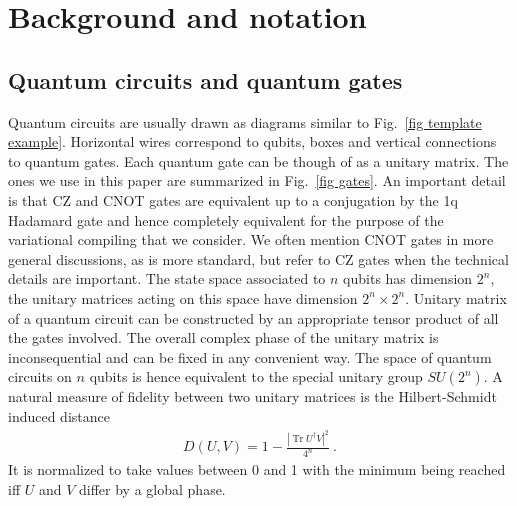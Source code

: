 \documentclass[twocolumn, amsfonts, amssymb, aps, nofootinbib]{revtex4-2}
\newcommand{\CZ}{\textsf{CZ }}
\newcommand{\CX}{\textsf{CNOT }}
\begin{document}
\section{Background and notation \label{sec gates}}
\subsection{Quantum circuits and quantum gates}
Quantum circuits are usually drawn as diagrams similar to Fig.~\ref{fig template example}. Horizontal wires correspond to qubits, boxes and vertical connections to quantum gates. Each quantum gate can be though of as a unitary matrix. The ones we use in this paper are summarized in Fig.~\ref{fig gates}. An important detail is that \CZ and \CX gates are equivalent up to a conjugation by the 1q Hadamard gate and hence completely equivalent for the purpose of the variational compiling that we consider. We often mention \CX gates in more general discussions, as is more standard, but refer to \CZ gates when the technical details are important.
The state space associated to $n$ qubits has dimension $2^n$, the unitary matrices acting on this space have dimension $2^n\times 2^n$. Unitary matrix of a quantum circuit can be constructed by an appropriate tensor product of all the gates involved. The overall complex phase of the unitary matrix is inconsequential and can be fixed in any convenient way. The space of quantum circuits on $n$ qubits is hence equivalent to the special unitary group $SU(2^n)$. A natural measure of fidelity between two unitary matrices is the Hilbert-Schmidt induced distance
\begin{align}
D(U, V)=1-\frac{|\operatorname{Tr}U^\dagger V|^2}{4^n} \ . \label{D hst}
\end{align}
It is normalized to take values between 0 and 1 with the minimum being reached iff $U$ and $V$ differ by a global phase.
\end{document}

